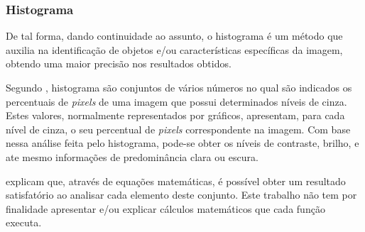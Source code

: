 \subsubsection{{Histograma}}

De tal forma, dando continuidade ao assunto, o histograma é um método que auxilia na identificação de objetos e/ou características específicas da imagem, obtendo uma maior precisão nos resultados obtidos.

Segundo , histograma são conjuntos de vários números no qual são indicados os percentuais de \textit{pixels} de uma imagem que possui determinados níveis de cinza. Estes valores, normalmente representados por gráficos, apresentam, para cada nível de cinza, o seu percentual de \textit{pixels} correspondente na imagem. Com base nessa análise feita pelo histograma, pode-se obter os níveis de contraste, brilho, e ate mesmo informações de predominância clara ou escura.

\begin{comment}
Para analisar cada elemento deste conjunto, \citeonline{FILHO1999} explicam, através de cálculos matemáticos, que é possível utilizando a equação a seguir:
\end{comment}

 explicam que, através de equações matemáticas, é possível obter um resultado satisfatório ao analisar cada elemento deste conjunto. Este trabalho não tem por finalidade apresentar e/ou explicar cálculos matemáticos que cada função executa.

%

\begin{comment}
Na tabela a seguir está sendo representado os exemplos matemáticos de histograma \cite{FILHO1999}.

\clearpage

\begin{table}[h]
\centering
\caption{{\footnotesize Exemplo de histograma.}}
\vspace{0.5cm}
\begin{tabular}{r|lr}
\hline
\hline 
Níveis de cinza (r_k) & n_k & p_r(r_k) \\ %
\hline
\hline %
0 & 1120    & 0,068 \\ 
1/7 & 3214  & 0,196 \\
2/7 & 4850  & 0,296 \\
3/7 & 3425  & 0,209 \\
4/7 & 1995  & 0,122 \\
5/7 & 784   & 0,048 \\
6/7 & 541   & 0,033 \\
1 & 455     & 0,028 \\  %
\hline
\hline
Total: & 16384 & 1 \\
\hline
\hline
\end{tabular}
\end{table}
\\
\end{comment}

